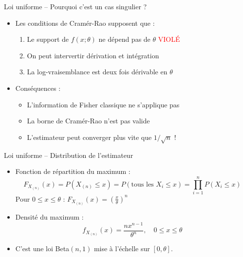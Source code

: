 \documentclass[11pt,aspectratio=169]{beamer}
\begin{document}
\begin{frame}{Loi uniforme -- Pourquoi c'est un cas singulier ?}

\begin{itemize}

\item Les conditions de Cramér-Rao supposent que :\newline
  \begin{enumerate}
    \item Le support de $f(x;\theta)$ ne dépend pas de $\theta$ \quad \textcolor{red}{VIOLÉ}\newline
    \item On peut intervertir dérivation et intégration\newline
    \item La log-vraisemblance est deux fois dérivable en $\theta$\newline
  \end{enumerate}

\item Conséquences :\newline
  \begin{itemize}
    \item L'information de Fisher classique ne s'applique pas\newline
    \item La borne de Cramér-Rao n'est pas valide\newline
    \item L'estimateur peut converger plus vite que $1/\sqrt{n}$ !
  \end{itemize}

\end{itemize}

\end{frame}

\begin{frame}{Loi uniforme -- Distribution de l'estimateur}

\begin{itemize}

\item Fonction de répartition du maximum :\newline
  \[
  F_{X_{(n)}}(x) = P(X_{(n)} \leq x) = P(\text{tous les } X_i \leq x) = \prod_{i=1}^n P(X_i \leq x)
  \]
  Pour $0 \leq x \leq \theta$ : $F_{X_{(n)}}(x) = \left(\frac{x}{\theta}\right)^n$\newline

\item Densité du maximum :
  \[
  \boxed{f_{X_{(n)}}(x) = \frac{n x^{n-1}}{\theta^n}, \quad 0 \leq x \leq \theta}
  \]

\item C'est une loi Beta$(n, 1)$ mise à l'échelle sur $[0, \theta]$.

\end{itemize}

\end{frame}
\end{document}
